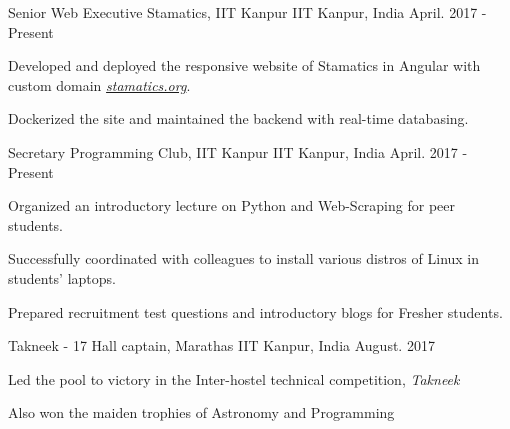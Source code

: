 


\begin{cventries}

  \cventry
    {Senior Web Executive }
    {Stamatics, IIT Kanpur}
    {IIT Kanpur, India}
    {April. 2017 - Present}
    {
      \begin{cvitems}
        \item Developed and deployed the responsive website of Stamatics in Angular with custom domain \href{http://stamatics.org}{\textit{stamatics.org}}.
        \item Dockerized the site and maintained the backend with real-time databasing.
      \end{cvitems}
    }

  \cventry
    {Secretary }
    {Programming Club, IIT Kanpur}
    {IIT Kanpur, India}
    {April. 2017 - Present}
    {
      \begin{cvitems}
		    \item Organized an introductory lecture on Python and Web-Scraping for peer students.
        \item Successfully coordinated with colleagues to install various distros of Linux in students' laptops.
        \item Prepared recruitment test questions and introductory blogs for Fresher students.
      \end{cvitems}
    }
    
  \cventry
    {Takneek - 17 }
    {Hall captain, Marathas}
    {IIT Kanpur, India}
    {August. 2017}
    {
      \begin{cvitems}
        \item Led the pool to victory in the Inter-hostel technical competition, \textit{Takneek}
        \item Also won the maiden trophies of Astronomy and Programming
      \end{cvitems}
    }

  
\end{cventries}

